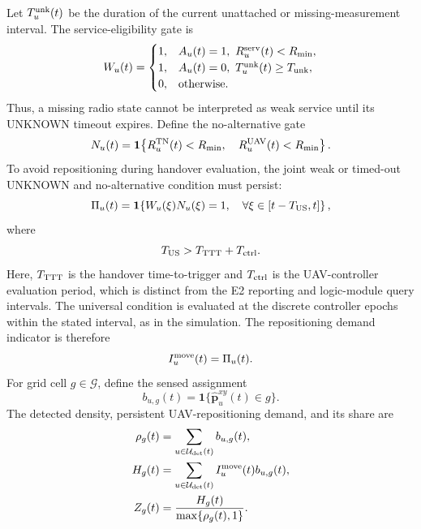 Let $T_u^{\rm unk}(t)$ be the duration of the current unattached or
missing-measurement interval. The service-eligibility gate is
\begin{equation}
 W_u(t)=
 \begin{cases}
 1,&A_u(t)=1,\ R_u^{\rm serv}(t)<R_{\min},\\
 1,&A_u(t)=0,\ T_u^{\rm unk}(t)\geq T_{\rm unk},\\
 0,&\text{otherwise}.
 \end{cases}
 \label{eq:service-eligibility}
\end{equation}
Thus, a missing radio state cannot be interpreted as weak service
until its UNKNOWN timeout expires. Define the no-alternative gate
\begin{equation}
 N_u(t)=\mathbf{1}\!\left\{
 R_u^{\rm TN}(t)<R_{\min},\quad
 R_u^{\rm UAV}(t)<R_{\min}\right\}.
 \label{eq:no-alternative}
\end{equation}
To avoid repositioning during handover evaluation, the joint weak
or timed-out UNKNOWN and no-alternative condition must persist:
\begin{equation}
\Pi_u(t)=\mathbf{1}\!\left\{
 W_u(\xi)N_u(\xi)=1,\quad
 \forall\xi\in[t-T_{\rm US},t]\right\},
 \label{eq:weak-persistence}
\end{equation}
where
\begin{equation}
 T_{\rm US}>T_{\rm TTT}+T_{\rm ctrl}.
 \label{eq:persistence-condition}
\end{equation}
Here, $T_{\rm TTT}$ is the handover time-to-trigger and
$T_{\rm ctrl}$ is the UAV-controller evaluation period, which is
distinct from the E2 reporting and logic-module query intervals. The
universal condition is evaluated at the discrete controller epochs within
the stated interval, as in the simulation. The repositioning demand
indicator is therefore
\begin{equation}
 I_u^{\rm move}(t)=\Pi_u(t).
 \label{eq:reposition-trigger}
\end{equation}
For grid cell $g\in\mathcal{G}$, define the sensed assignment
\begin{equation}
 b_{u,g}(t)=
 \mathbf{1}\{\widehat{\mathbf{p}}^{xy}_u(t)\in g\}.
 \label{eq:grid-assignment}
\end{equation}
The detected density, persistent UAV-repositioning demand, and its
share are
\begin{align}
 \rho_g(t)&=\sum_{u\in\mathcal{U}_{\rm det}(t)}b_{u,g}(t),\\
 H_g(t)&=\sum_{u\in\mathcal{U}_{\rm det}(t)}
 I_u^{\rm move}(t)b_{u,g}(t),\\
 Z_g(t)&=\frac{H_g(t)}{\max\{\rho_g(t),1\}}.
 \label{eq:grid-statistics}
\end{align}

